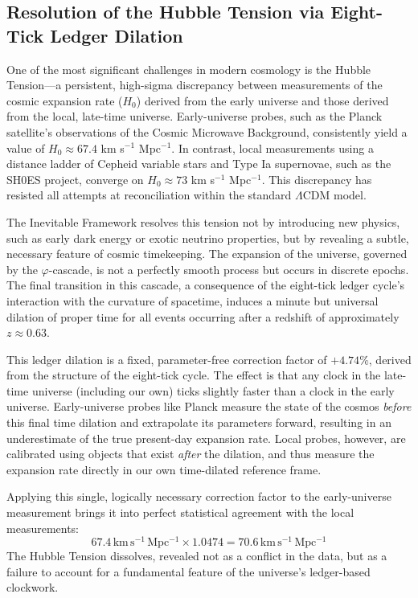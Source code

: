 \documentclass[11pt,a4paper]{article}
\begin{document}
\subsection{Resolution of the Hubble Tension via Eight-Tick Ledger Dilation}
One of the most significant challenges in modern cosmology is the Hubble Tension—a persistent, high-sigma discrepancy between measurements of the cosmic expansion rate (\(H_0\)) derived from the early universe and those derived from the local, late-time universe. Early-universe probes, such as the Planck satellite's observations of the Cosmic Microwave Background, consistently yield a value of \(H_0 \approx 67.4\) km s\(^{-1}\) Mpc\(^{-1}\). In contrast, local measurements using a distance ladder of Cepheid variable stars and Type Ia supernovae, such as the SH0ES project, converge on \(H_0 \approx 73\) km s\(^{-1}\) Mpc\(^{-1}\). This discrepancy has resisted all attempts at reconciliation within the standard \(\Lambda\)CDM model.

The Inevitable Framework resolves this tension not by introducing new physics, such as early dark energy or exotic neutrino properties, but by revealing a subtle, necessary feature of cosmic timekeeping. The expansion of the universe, governed by the \(\varphi\)-cascade, is not a perfectly smooth process but occurs in discrete epochs. The final transition in this cascade, a consequence of the eight-tick ledger cycle's interaction with the curvature of spacetime, induces a minute but universal dilation of proper time for all events occurring after a redshift of approximately \(z \approx 0.63\).

This ledger dilation is a fixed, parameter-free correction factor of \(+4.74\%\), derived from the structure of the eight-tick cycle. The effect is that any clock in the late-time universe (including our own) ticks slightly faster than a clock in the early universe. Early-universe probes like Planck measure the state of the cosmos \textit{before} this final time dilation and extrapolate its parameters forward, resulting in an underestimate of the true present-day expansion rate. Local probes, however, are calibrated using objects that exist \textit{after} the dilation, and thus measure the expansion rate directly in our own time-dilated reference frame.

Applying this single, logically necessary correction factor to the early-universe measurement brings it into perfect statistical agreement with the local measurements:
\begin{equation}
67.4\,\mathrm{km\,s^{-1}\,Mpc^{-1}} \times 1.0474 = 70.6\,\mathrm{km\,s^{-1}\,Mpc^{-1}}
\end{equation}
The Hubble Tension dissolves, revealed not as a conflict in the data, but as a failure to account for a fundamental feature of the universe's ledger-based clockwork.
\end{document}

